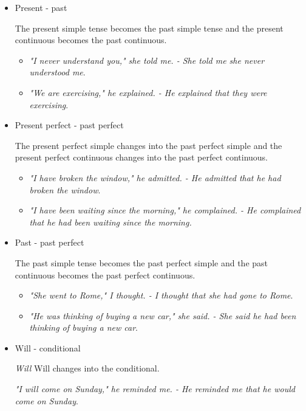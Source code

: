 \begin{itemize}

\item Present - past

The present simple tense becomes the past simple tense and the present continuous becomes the past continuous.

\begin{itemize}
\item \textit{"I never understand you," she told me. - She told me she never understood me}.
\item \textit{"We are exercising," he explained. - He explained that they were exercising}.
\end{itemize}

\item Present perfect - past perfect 

The present perfect simple changes into the past perfect simple and the present perfect continuous changes into the past perfect continuous.

\begin{itemize}
\item \textit{"I have broken the window," he admitted. - He admitted that he had broken the window}.
\item \textit{"I have been waiting since the morning," he complained. - He complained that he had been waiting since the morning.}
\end{itemize}

\item Past - past perfect

The past simple tense becomes the past perfect simple and the past continuous becomes the past perfect continuous.

\begin{itemize}
\item \textit{"She went to Rome," I thought. - I thought that she had gone to Rome}.
\item \textit{"He was thinking of buying a new car," she said. - She said he had been thinking of buying a new car}.
\end{itemize}

\item Will - conditional

\textit{Will} Will changes into the conditional.

\textit{"I will come on Sunday," he reminded me. - He reminded me that he would come on Sunday}.

\end{itemize}

